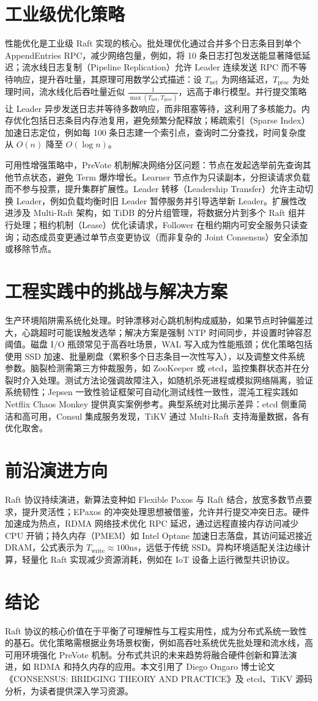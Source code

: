 \chapter{工业级优化策略}
性能优化是工业级 Raft 实现的核心。批处理优化通过合并多个日志条目到单个 AppendEntries RPC，减少网络包量，例如，将 10 条日志打包发送能显著降低延迟；流水线日志复制（Pipeline Replication）允许 Leader 连续发送 RPC 而不等待响应，提升吞吐量，其原理可用数学公式描述：设 $T_{\text{net}}$ 为网络延迟，$T_{\text{proc}}$ 为处理时间，流水线化后吞吐量近似 $\frac{1}{\max(T_{\text{net}}, T_{\text{proc}})}$，远高于串行模型。并行提交策略让 Leader 异步发送日志并等待多数响应，而非阻塞等待，这利用了多核能力。内存优化包括日志条目内存池复用，避免频繁分配释放；稀疏索引（Sparse Index）加速日志定位，例如每 100 条日志建一个索引点，查询时二分查找，时间复杂度从 $O(n)$ 降至 $O(\log n)$。\par
可用性增强策略中，PreVote 机制解决网络分区问题：节点在发起选举前先查询其他节点状态，避免 Term 爆炸增长。Learner 节点作为只读副本，分担读请求负载而不参与投票，提升集群扩展性。Leader 转移（Leadership Transfer）允许主动切换 Leader，例如负载均衡时旧 Leader 暂停服务并引导选举新 Leader。扩展性改进涉及 Multi-Raft 架构，如 TiDB 的分片组管理，将数据分片到多个 Raft 组并行处理；租约机制（Lease）优化读请求，Follower 在租约期内可安全服务只读查询；动态成员变更通过单节点变更协议（而非复杂的 Joint Consensus）安全添加或移除节点。\par
\chapter{工程实践中的挑战与解决方案}
生产环境陷阱需系统化处理。时钟漂移对心跳机制构成威胁，如果节点时钟偏差过大，心跳超时可能误触发选举；解决方案是强制 NTP 时间同步，并设置时钟容忍阈值。磁盘 I/O 瓶颈常见于高吞吐场景，WAL 写入成为性能瓶颈；优化策略包括使用 SSD 加速、批量刷盘（累积多个日志条目一次性写入），以及调整文件系统参数。脑裂检测需第三方仲裁服务，如 ZooKeeper 或 etcd，监控集群状态并在分裂时介入处理。测试方法论强调故障注入，如随机杀死进程或模拟网络隔离，验证系统韧性；Jepsen 一致性验证框架可自动化测试线性一致性，混沌工程实践如 Netflix Chaos Monkey 提供真实案例参考。典型系统对比揭示差异：etcd 侧重简洁和高可用，Consul 集成服务发现，TiKV 通过 Multi-Raft 支持海量数据，各有优化取舍。\par
\chapter{前沿演进方向}
Raft 协议持续演进，新算法变种如 Flexible Paxos 与 Raft 结合，放宽多数节点要求，提升灵活性；EPaxos 的冲突处理思想被借鉴，允许并行提交冲突日志。硬件加速成为热点，RDMA 网络技术优化 RPC 延迟，通过远程直接内存访问减少 CPU 开销；持久内存（PMEM）如 Intel Optane 加速日志落盘，其访问延迟接近 DRAM，公式表示为 $T_{\text{write}} \approx 100\text{ns}$，远低于传统 SSD。异构环境适配关注边缘计算，轻量化 Raft 实现减少资源消耗，例如在 IoT 设备上运行微型共识协议。\par
\chapter{结论}
Raft 协议的核心价值在于平衡了可理解性与工程实用性，成为分布式系统一致性的基石。优化策略需根据业务场景权衡，例如高吞吐系统优先批处理和流水线，高可用环境强化 PreVote 机制。分布式共识的未来趋势将融合硬件创新和算法演进，如 RDMA 和持久内存的应用。本文引用了 Diego Ongaro 博士论文《CONSENSUS: BRIDGING THEORY AND PRACTICE》及 etcd、TiKV 源码分析，为读者提供深入学习资源。\par
